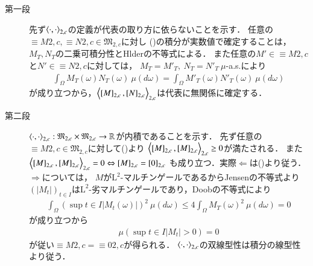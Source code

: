 	\begin{prf}\mbox{}
		\begin{description}
			\item[第一段]
				先ず$\inprod<\cdot,\cdot>_{2,c}$の定義が代表の取り方に依らないことを示す．
				任意の$\equiv{M}{2,c},\equiv{N}{2,c} \in \mathfrak{M}_{2,c}$に対し
				()の積分が実数値で確定することは，
				$M_T,N_T$の二乗可積分性とHlderの不等式による．
				また任意の$M' \in \equiv{M}{2,c}$と$N' \in \equiv{N}{2,c}$に対しては，
				$M_T = M'_T,\ N_T = N'_T\ \mu$-a.s.により
				\begin{align}
					\int_{\Omega} M_T(\omega)N_T(\omega)\ \mu(d\omega) = \int_{\Omega} M'_T(\omega)N'_T(\omega)\ \mu(d\omega)
				\end{align}
				が成り立つから，$\inprod<\equiv{M}{2,c},\equiv{N}{2,c}>_{2,c}$は代表に無関係に確定する．
	
			\item[第二段]
				$\inprod<\cdot,\cdot>_{2,c}:\mathfrak{M}_{2,c} \times \mathfrak{M}_{2,c} \rightarrow \R$が内積であることを示す．
				先ず任意の$\equiv{M}{2,c} \in \mathfrak{M}_{2,c}$に対して()より
				$\inprod<\equiv{M}{2,c},\equiv{M}{2,c}>_{2,c} \geq 0$が満たされる．
				また$\inprod<\equiv{M}{2,c},\equiv{M}{2,c}>_{2,c} = 0 \Leftrightarrow \equiv{M}{2,c} = \equiv{0}{2,c}$
				も成り立つ．実際$\Leftarrow$は()より従う．$\Rightarrow$については，
				$M$が$\mathrm{L}^2$-マルチンゲールであるからJensenの不等式より
				$(|M_t|)_{t \in I}$は$\mathrm{L}^2$-劣マルチンゲールであり，Doobの不等式により
				\begin{align}
					\int_{\Omega} \left( \sup{t \in I}{|M_t(\omega)|} \right)^2\ \mu(d\omega) \leq 4 \int_{\Omega} {M_T(\omega)}^2\ \mu(d\omega) = 0
				\end{align}
				が成り立つから
				\begin{align}
					\mu\left( \sup{t \in I}{|M_t|} > 0 \right) = 0
				\end{align}
				が従い$\equiv{M}{2,c} = \equiv{0}{2,c}$が得られる．
				$\inprod<\cdot,\cdot>_{2,c}$の双線型性は積分の線型性より従う．
				\QED
		\end{description}
	\end{prf}
		
